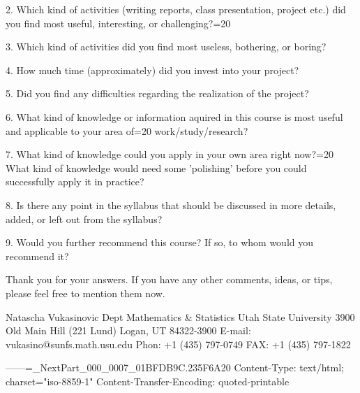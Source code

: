 2. Which kind of activities (writing reports,
class presentation, project etc.)
did you find most useful, interesting,
or challenging?=20

3. Which kind of activities did you find
most useless, bothering, or boring?

4. How much time (approximately) did
you invest into your project?

5. Did you find any difficulties regarding
the realization of the project?

6. What kind of knowledge or information
aquired in this course is most useful
and applicable to your area of=20
work/study/research?

7. What kind of knowledge could you
apply in your own area right now?=20
What kind of knowledge would need
some 'polishing' before you could
successfully apply it in practice?

8. Is there any point in the syllabus
that should be discussed in more details,
added, or left out from the syllabus?

9. Would you further recommend this
course? If so, to whom would you
recommend it?

Thank you for your answers. If you
have any other comments, ideas, or
tips, please feel free to mention
them now.

Natascha Vukasinovic
Dept Mathematics & Statistics
Utah State University
3900 Old Main Hill (221 Lund)
Logan, UT 84322-3900
E-mail: vukasino@sunfs.math.usu.edu
Phon: +1 (435) 797-0749
FAX: +1 (435) 797-1822

------=_NextPart_000_0007_01BFDB9C.235F6A20
Content-Type: text/html;
	charset="iso-8859-1"
Content-Transfer-Encoding: quoted-printable

